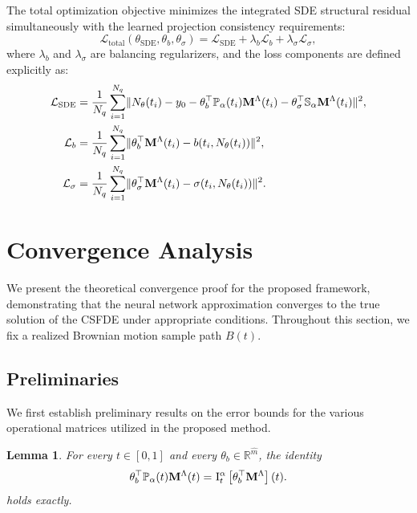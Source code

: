 \documentclass[11pt, a4paper]{article}
\theoremstyle{theoremstyle}
\newtheorem{lemma}[theorem]{Lemma}
\theoremstyle{definitionstyle}
\DeclarePairedDelimiter{\norm}{\lVert}{\rVert}
\begin{document}
The total optimization objective minimizes the integrated SDE structural residual simultaneously with the learned projection consistency requirements:
\begin{equation} \mathcal L_{\text{total}}(\theta_{\text{SDE}}, \theta_b, \theta_\sigma) = \mathcal L_{\text{SDE}} + \lambda_b \mathcal L_b + \lambda_\sigma \mathcal L_\sigma, \end{equation}
where $\lambda_b$ and $\lambda_\sigma$ are balancing regularizers, and the loss components are defined explicitly as:
\begin{subequations}
\begin{align}
    \mathcal{L}_{\text{SDE}} &= \frac{1}{N_q} \sum_{i=1}^{N_q} \norm{ N_\theta(t_i) - y_0 - \theta_b^\top \mathbb P_\alpha(t_i) \mathbf{M}^\Lambda(t_i) - \theta_\sigma^\top \mathbb S_\alpha \mathbf{M}^\Lambda(t_i) }^2, \label{eq:29a} \\
    \mathcal{L}_{b} &= \frac{1}{N_q} \sum_{i=1}^{N_q} \norm{ \theta_b^\top \mathbf{M}^\Lambda(t_i) - b(t_i, N_\theta(t_i)) }^2, \\
    \mathcal{L}_{\sigma} &= \frac{1}{N_q} \sum_{i=1}^{N_q} \norm{ \theta_\sigma^\top \mathbf{M}^\Lambda(t_i) - \sigma(t_i, N_\theta(t_i)) }^2.
\end{align}
\end{subequations}

\section{Convergence Analysis}
We present the theoretical convergence proof for the proposed framework, demonstrating that the neural network approximation converges to the true solution of the CSFDE under appropriate conditions. Throughout this section, we fix a realized Brownian motion sample path \( B(t) \).

\subsection{Preliminaries}
We first establish preliminary results on the error bounds for the various operational matrices utilized in the proposed method.

\begin{lemma}\label{lem:3.1}
    For every \( t \in [0, 1] \) and every \( \theta_b \in \mathbb R^{\hat m} \), the identity
    \begin{equation}
        \theta^\top_b \mathbb P_{\alpha}(t)\mathbf M^\Lambda(t) = \II \left [\theta^\top_b \mathbf M^\Lambda \right ](t).
    \end{equation}
    holds exactly.
\end{lemma}
\end{document}
